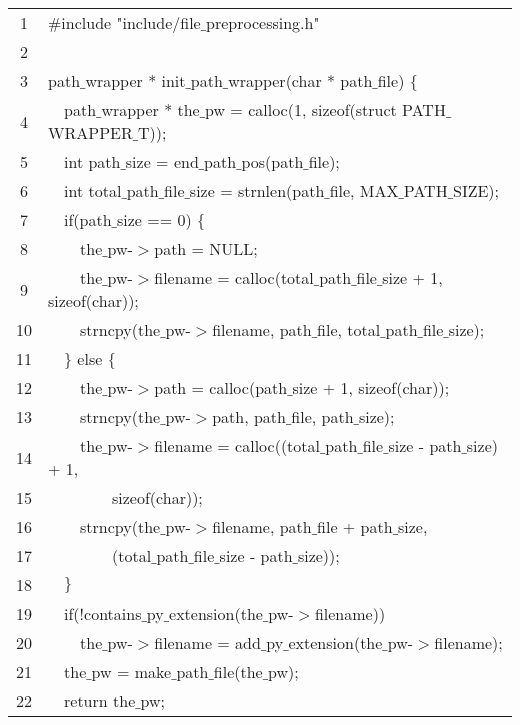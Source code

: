 \documentclass{report}
\newcommand{\tab}{$\quad$}
\newcommand{\csfont}[1]{\fontfamily{cmtt}\selectfont #1}
\begin{document}
\begin{tabular}{c|l}
  1 & {\csfont{$\#$include "include/file$\_$preprocessing.h"}} \\
  2 & {\csfont{}} \\
  3 & {\csfont{path$\_$wrapper * init$\_$path$\_$wrapper(char * path$\_$file) $\{$}} \\
  4 & {\csfont{\tab path$\_$wrapper * the$\_$pw = calloc(1, sizeof(struct PATH$\_$WRAPPER$\_$T));}} \\
  5 & {\csfont{\tab int path$\_$size = end$\_$path$\_$pos(path$\_$file);}} \\
  6 & {\csfont{\tab int total$\_$path$\_$file$\_$size = strnlen(path$\_$file, MAX$\_$PATH$\_$SIZE);}} \\
  7 & {\csfont{\tab if(path$\_$size == 0) $\{$}} \\
  8 & {\csfont{\tab \tab the$\_$pw-$>$path = NULL;}} \\
  9 & {\csfont{\tab \tab the$\_$pw-$>$filename = calloc(total$\_$path$\_$file$\_$size + 1, sizeof(char));}} \\
  10 & {\csfont{\tab \tab strncpy(the$\_$pw-$>$filename, path$\_$file, total$\_$path$\_$file$\_$size);}} \\
  11 & {\csfont{\tab $\}$ else $\{$}} \\
  12 & {\csfont{\tab \tab the$\_$pw-$>$path = calloc(path$\_$size + 1, sizeof(char));}} \\
  13 & {\csfont{\tab \tab strncpy(the$\_$pw-$>$path, path$\_$file, path$\_$size);}} \\
  14 & {\csfont{\tab \tab the$\_$pw-$>$filename = calloc((total$\_$path$\_$file$\_$size - path$\_$size) + 1,}} \\
  15 & {\csfont{\tab \tab \tab \tab sizeof(char));}} \\
  16 & {\csfont{\tab \tab strncpy(the$\_$pw-$>$filename, path$\_$file + path$\_$size,}} \\
  17 & {\csfont{\tab \tab \tab \tab (total$\_$path$\_$file$\_$size - path$\_$size));}} \\
  18 & {\csfont{\tab $\}$}} \\
  19 & {\csfont{\tab if(!contains$\_$py$\_$extension(the$\_$pw-$>$filename))}} \\
  20 & {\csfont{\tab \tab the$\_$pw-$>$filename = add$\_$py$\_$extension(the$\_$pw-$>$filename);}} \\
  21 & {\csfont{\tab the$\_$pw = make$\_$path$\_$file(the$\_$pw);}} \\
  22 & {\csfont{\tab return the$\_$pw;}} \\

\end{tabular}
\end{document}
